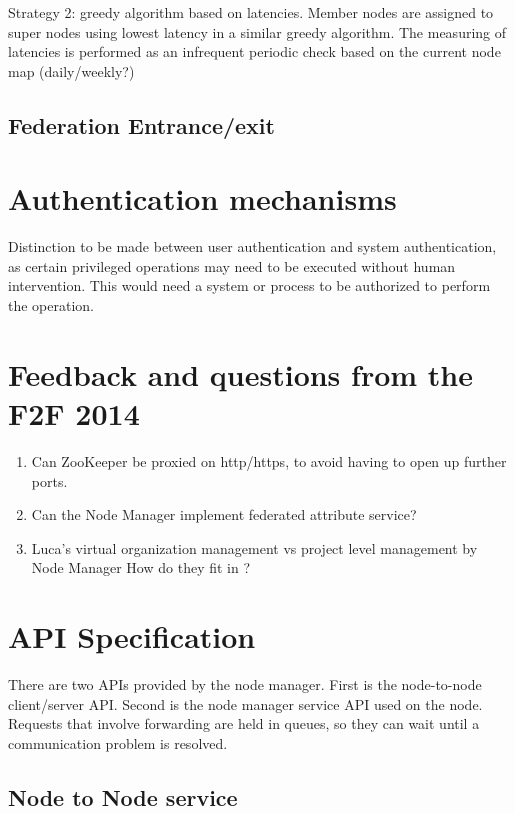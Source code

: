 \documentclass[oneside,12pt]{memoir}
\def\nm{Node Manager{ }}
\begin{document}
Strategy 2:  greedy algorithm based on latencies.  Member nodes are assigned to super nodes using lowest latency in a similar greedy algorithm.  The measuring of latencies is performed as an infrequent periodic check based on the current node map (daily/weekly?)

\subsection{Federation Entrance/exit}



\section{Authentication mechanisms}
Distinction to be made between user authentication and system authentication, as certain privileged operations may need to be executed without human intervention. This would need a system or process to be authorized to perform the operation. 



\section{Feedback and questions from the F2F 2014}
\begin{enumerate}
\item Can ZooKeeper be proxied on http/https, to avoid having to open up further ports.
\item Can the \nm implement federated attribute service?
\item Luca's virtual organization management vs project level management by \nm How do they fit in ?
\end{enumerate}

\section{API Specification}

There are two APIs provided by the node manager.  First is the node-to-node client/server API.  Second is the node manager service API used on the node.  Requests that involve forwarding are held in queues, so they can wait until a communication problem is resolved. 

\subsection{Node to Node service}
\end{document}
